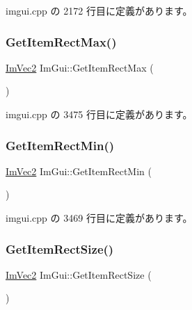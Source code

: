  imgui.\+cpp の 2172 行目に定義があります。

\mbox{\label{namespace_im_gui_a3d260209b8dc25a2c942e8cfd1ed0e51}} 
\subsubsection{\texorpdfstring{Get\+Item\+Rect\+Max()}{GetItemRectMax()}}
{\footnotesize\ttfamily \mbox{\hyperlink{struct_im_vec2}{Im\+Vec2}} Im\+Gui\+::\+Get\+Item\+Rect\+Max (\begin{DoxyParamCaption}{ }\end{DoxyParamCaption})}



 imgui.\+cpp の 3475 行目に定義があります。

\mbox{\label{namespace_im_gui_a65b24b72ec0e8444c705cebf3e91f570}} 
\subsubsection{\texorpdfstring{Get\+Item\+Rect\+Min()}{GetItemRectMin()}}
{\footnotesize\ttfamily \mbox{\hyperlink{struct_im_vec2}{Im\+Vec2}} Im\+Gui\+::\+Get\+Item\+Rect\+Min (\begin{DoxyParamCaption}{ }\end{DoxyParamCaption})}



 imgui.\+cpp の 3469 行目に定義があります。

\mbox{\label{namespace_im_gui_a3303d1c37041307e11fd46fc43b2274d}} 
\subsubsection{\texorpdfstring{Get\+Item\+Rect\+Size()}{GetItemRectSize()}}
{\footnotesize\ttfamily \mbox{\hyperlink{struct_im_vec2}{Im\+Vec2}} Im\+Gui\+::\+Get\+Item\+Rect\+Size (\begin{DoxyParamCaption}{ }\end{DoxyParamCaption})}



